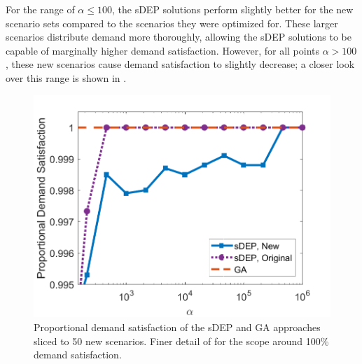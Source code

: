 \documentclass[12pt,dvipsnames]{report}
\begin{document}
For the range of $\alpha \leq 100$, the sDEP solutions perform slightly better for the new scenario sets compared to the scenarios they were optimized for.  These larger scenarios distribute demand more thoroughly, allowing the sDEP solutions to be capable of marginally higher demand satisfaction.  However, for all points $\alpha > 100$, these new scenarios cause demand satisfaction to slightly decrease; a closer look over this range is shown in .

\begin{figure}[htp]
	\centering
	\includegraphics[height=0.4\textheight]{Figures/Prelim_EvalO25_ComparisonSatisfactionZoomed}
	\caption[Demand satisfaction of the preliminary simulations evaluated against 50 new scenarios in finer detail]{Proportional demand satisfaction of the sDEP and GA approaches sliced to 50 new scenarios. Finer detail of  for the scope around 100\% demand satisfaction.}
	\label{fig:Prelim_VWNCompSatisEvalClose}
\end{figure}
\end{document}
